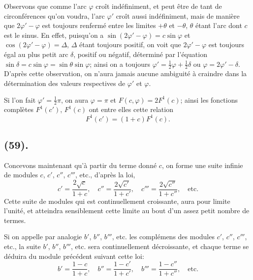 \documentclass{article}
\begin{document}
Observons que comme l'arc $\varphi$ croît indéfiniment, et peut être de tant de circonférences qu'on voudra, l'arc $\varphi'$ croît aussi indéfiniment, mais de manière que $2\varphi'-\varphi$ est toujours renfermé entre les limites $+\theta$ et $-\theta$, $\theta$ étant l'arc dont $c$ est le sinus. En effet, puisqu'on a $\sin(2\varphi'-\varphi)=c\sin\varphi$ et $\cos(2\varphi'-\varphi)=\Delta$, $\Delta$ étant toujours positif, on voit que $2\varphi'-\varphi$ est toujours égal au plus petit arc $\delta$, positif ou négatif, déterminé par l'équation $\sin\delta=c\sin\varphi=\sin\theta\sin\varphi$; ainsi on a toujours $\varphi'=\frac{1}{2}\varphi+\frac{1}{2}\delta$ ou $\varphi=2\varphi'-\delta$. D'après cette observation, on n'aura jamais aucune ambiguité à craindre dans la détermination des valeurs respectives de $\varphi'$ et $\varphi$.

Si l'on fait $\varphi'=\frac{1}{2}\pi$, on aura $\varphi=\pi$ et $F(c,\varphi)=2F^{1}(c)$; ainsi les fonctions complètes $F^{1}(c')$, $F^{1}(c)$ ont entre elles cette relation
\[ F^{1}(c')=(1+c)F^{1}(c). \]

\subsection*{(59).}

Concevons maintenant qu'à partir du terme donné $c$, on forme une suite infinie de modules $c$, $c'$, $c''$, $c'''$, etc., d'après la loi,
\[ c'=\frac{2\sqrt{c}}{1+c},\quad c''=\frac{2\sqrt{c'}}{1+c'},\quad c'''=\frac{2\sqrt{c''}}{1+c''},\quad\text{etc.} \]
Cette suite de modules qui est continuellement croissante, aura pour limite l'unité, et atteindra sensiblement cette limite au bout d'un assez petit nombre de termes.

Si on appelle par analogie $b'$, $b''$, $b'''$, etc. les complémens des modules $c'$, $c''$, $c'''$, etc., la suite $b'$, $b''$, $b'''$, etc. sera continuellement décroissante, et chaque terme se déduira du module précédent suivant cette loi:
\[ b'=\frac{1-c}{1+c},\quad b''=\frac{1-c'}{1+c'},\quad b'''=\frac{1-c''}{1+c''},\quad\text{etc.} \]

\end{document}
